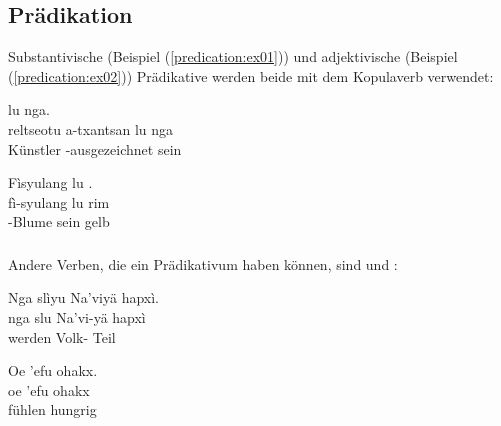 \subsection{Prädikation} Substantivische (Beispiel (\ref{predication:ex01})) und adjektivische (Beispiel (\ref{predication:ex02})) Prädikative werden beide mit dem Kopulaverb   verwendet:\label{syn:predicates}

\begin{interlin} \label{predication:ex01}
	\glll \Npawl{}  lu nga. \\
	reltseotu a-txantsan lu nga \\
	Künstler -ausgezeichnet sein  \\
\end{interlin}

\begin{interlin} \label{predication:ex02}
	\glll \Npawl{}Fìsyulang lu . \\
	fì-syulang lu rim\\
	-Blume sein gelb\\
\end{interlin}

\subsubsection{} Andere Verben, die ein Prädikativum haben können, sind   und  :

\begin{interlin}
	\glll Nga slìyu Na'viyä hapxì. \\
	nga slu Na'vi-yä hapxì \\
	 werden Volk- Teil\\
\end{interlin}

\begin{interlin}
	\glll Oe 'efu ohakx. \\
	oe 'efu ohakx \\
	 fühlen hungrig \\
\end{interlin}

